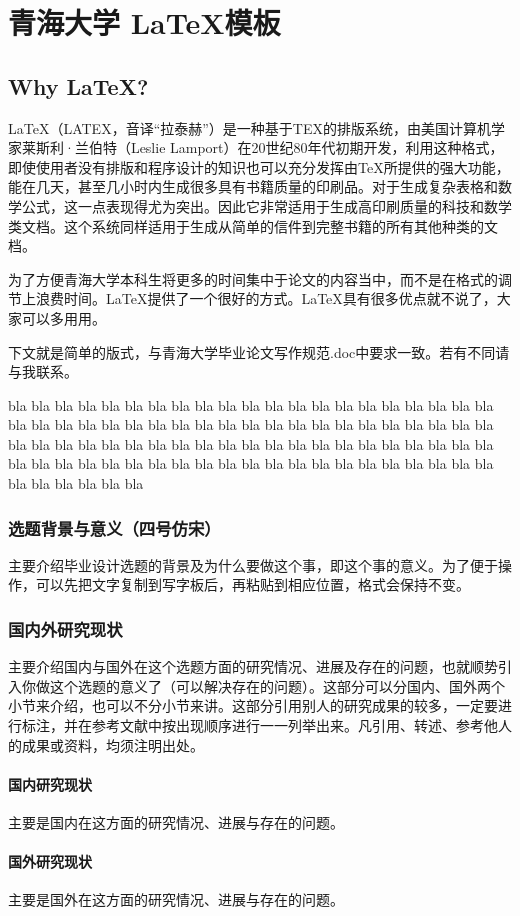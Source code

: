 
\renewcommand{\headrulewidth}{0.4pt} 
\chapter{青海大学 \LaTeX 模板}
\section{Why \LaTeX ? }
\LaTeX（LATEX，音译“拉泰赫”）是一种基于TEX的排版系统，由美国计算机学家莱斯利·兰伯特（Leslie Lamport）在20世纪80年代初期开发，利用这种格式，即使使用者没有排版和程序设计的知识也可以充分发挥由\TeX{}所提供的强大功能，能在几天，甚至几小时内生成很多具有书籍质量的印刷品。对于生成复杂表格和数学公式，这一点表现得尤为突出。因此它非常适用于生成高印刷质量的科技和数学类文档。这个系统同样适用于生成从简单的信件到完整书籍的所有其他种类的文档。

为了方便青海大学本科生将更多的时间集中于论文的内容当中，而不是在格式的调节上浪费时间。\LaTeX 提供了一个很好的方式。\LaTeX 具有很多优点就不说了，大家可以多用用。
\par 下文就是简单的版式，与青海大学毕业论文写作规范.doc中要求一致。若有不同请与我联系。

bla bla bla bla bla bla bla bla bla bla bla bla bla bla bla bla bla bla bla bla bla bla bla bla bla bla bla bla bla bla bla bla bla bla bla bla bla bla bla bla bla bla bla bla bla bla bla bla bla bla bla bla bla bla bla bla bla bla bla bla bla bla bla bla bla bla bla bla bla bla bla bla bla bla bla bla bla bla bla bla bla bla bla bla bla bla bla bla bla bla

\subsection{选题背景与意义（四号仿宋）}
主要介绍毕业设计选题的背景及为什么要做这个事，即这个事的意义。为了便于操作，可以先把文字复制到写字板后，再粘贴到相应位置，格式会保持不变。
\subsection{国内外研究现状}
主要介绍国内与国外在这个选题方面的研究情况、进展及存在的问题，也就顺势引入你做这个选题的意义了（可以解决存在的问题）。这部分可以分国内、国外两个小节来介绍，也可以不分小节来讲。这部分引用别人的研究成果的较多，一定要进行标注，并在参考文献中按出现顺序进行一一列举出来。凡引用、转述、参考他人的成果或资料，均须注明出处。
\subsubsection{国内研究现状}
主要是国内在这方面的研究情况、进展与存在的问题。
\subsubsection{国外研究现状}
主要是国外在这方面的研究情况、进展与存在的问题。
